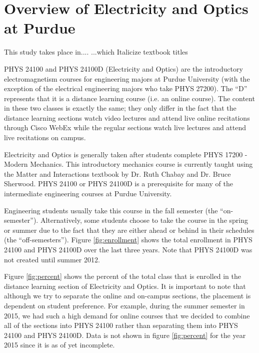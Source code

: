 
\section{Overview of Electricity and Optics at Purdue}

This study takes place in.... ...which
Italicize textbook titles

PHYS 24100 and PHYS 24100D (Electricity and Optics) are the introductory electromagnetism courses for engineering majors at Purdue University (with the exception of the electrical engineering majors who take PHYS 27200). The ``D'' represents that it is a distance learning course (i.e. an online course). The content in these two classes is exactly the same; they only differ in the fact that the distance learning sections watch video lectures and attend live online recitations through Cisco WebEx while the regular sections watch live lectures and attend live recitations on campus.

Electricity and Optics is generally taken after students complete PHYS 17200 - Modern Mechanics. This introductory mechanics course is currently taught using the Matter and Interactions textbook by Dr. Ruth Chabay and Dr. Bruce Sherwood\cite{chabay2010}. PHYS 24100 or PHYS 24100D is a prerequisite for many of the intermediate engineering courses at Purdue University.

Engineering students usually take this course in the fall semester (the ``on-semester''). Alternatively, some students choose to take the course in the spring or summer due to the fact that they are either ahead or behind in their schedules (the ``off-semesters''). Figure \ref{fig:enrollment} shows the total enrollment in PHYS 24100 and PHYS 24100D over the last three years. Note that PHYS 24100D was not created until summer 2012.

Figure \ref{fig:percent} shows the percent of the total class that is enrolled in the distance learning section of Electricity and Optics. It is important to note that although we try to separate the online and on-campus sections, the placement is dependent on student preference. For example, during the summer semester in 2015, we had such a high demand for online courses that we decided to combine all of the sections into PHYS 24100 rather than separating them into PHYS 24100 and PHYS 24100D. Data is not shown in figure \ref{fig:percent} for the year 2015 since it is as of yet incomplete.

